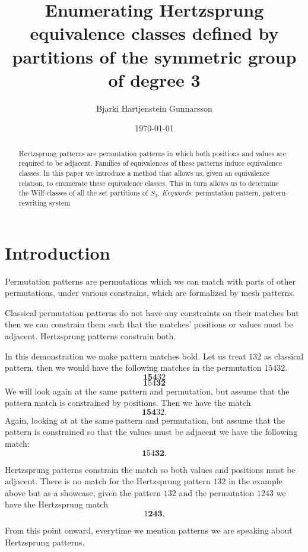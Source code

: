 \documentclass[openany, a4paper, 11pt, english]{article}
\newcommand{\breath}{\vspace{6pt plus 2pt minus 1pt}\noindent}
\theoremstyle{definition}
\newcommand{\Sym}{S}
\begin{document}
\title{Enumerating Hertzsprung equivalence classes defined by partitions of the symmetric group of degree 3}
\author{Bjarki Hartjenstein Gunnarsson}
\date{\today}
\maketitle

\begin{abstract}
    Hertzsprung patterns are permutation patterns in which both positions and
    values are required to be adjacent. Families of equivalences of these
    patterns induce equivalence classes. In this paper we introduce a method
    that allows us, given an equivalence relation, to enumerate these
    equivalence classes. This in turn allows us to determine the Wilf-classes of
    all the set partitions of $\Sym_3$.
    \breath \emph{Keywords}: permutation pattern, pattern-rewriting system
\end{abstract}

\section{Introduction}
Permutation patterns are permutations which we can match with parts of other
permutations, under various constrains, which are formalized by mesh patterns.
\cite{claesson:2011}

Classical permutation patterns do not have any constraints on their matches but then we can
constrain them such that the matches' positions or values must be adjacent.
Hertzsprung patterns constrain both. 

In this demonstration we make pattern matches bold.  Let us treat $132$ as classical
pattern, then we would have the following matches in the permutation $15432$.
\[
    \bm{154}32
\]
\[
    \bm{1}54\bm{32}
\]
We will look again at the same pattern and permutation, but assume that the
pattern match is constrained by positions. Then we have the match
\[
    \bm{154}32.
\]
Again, looking at at the same pattern and permutation, but assume that the
pattern is constrained so that the values must be adjacent we have the following
match:
\[
    \bm{1}54\bm{32}.
\]

Hertzsprung patterns constrain the match so both values and positions must be
adjacent. There is no match for the Hertzsprung pattern $132$ in the example
above but as a showcase, given the pattern $132$ and the permutation $1243$ we
have the Hertzsprung match
\[
    1\bm{243}.
\]

From this point onward, everytime we mention patterns we are speaking about
Hertzsprung patterns.
\end{document}

